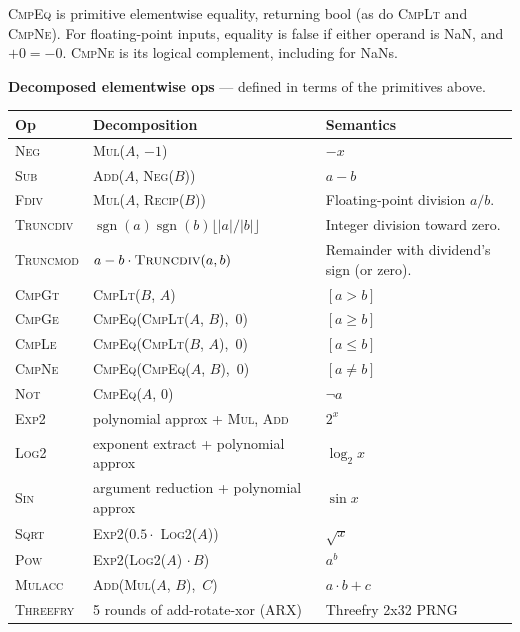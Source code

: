 \documentclass[10pt,letterpaper]{article}
\newcommand{\op}[1]{\textsc{#1}}
\begin{document}
\medskip
\op{CmpEq} is primitive elementwise equality, returning bool (as do \op{CmpLt} and \op{CmpNe}). For floating-point inputs, equality is false if either operand is NaN, and $+0 = -0$. \op{CmpNe} is its logical complement, including for NaNs.

\medskip
\noindent\begin{minipage}{\linewidth}
\textbf{Decomposed elementwise ops} --- defined in terms of the primitives above.

\smallskip
\begin{tabular}{@{}l l l@{}}
\toprule
\textbf{Op} & \textbf{Decomposition} & \textbf{Semantics} \\
\midrule
\op{Neg} & \op{Mul}($A$, $-1$) & $-x$ \\
\op{Sub} & \op{Add}($A$, \op{Neg}($B$)) & $a - b$ \\
\op{Fdiv} & \op{Mul}($A$, \op{Recip}($B$)) & Floating-point division $a / b$. \\
\op{Truncdiv} & $\operatorname{sgn}(a)\operatorname{sgn}(b)\lfloor |a|/|b| \rfloor$ & Integer division toward zero. \\
\op{Truncmod} & $a - b \cdot \op{Truncdiv}(a,b)$ & Remainder with dividend's sign (or zero). \\
\op{CmpGt} & \op{CmpLt}($B$, $A$) & $[a > b]$ \\
\op{CmpGe} & \op{CmpEq}(\op{CmpLt}($A$, $B$),\, $0$) & $[a \ge b]$ \\
\op{CmpLe} & \op{CmpEq}(\op{CmpLt}($B$, $A$),\, $0$) & $[a \le b]$ \\
\op{CmpNe} & \op{CmpEq}(\op{CmpEq}($A$, $B$),\, $0$) & $[a \ne b]$ \\
\op{Not} & \op{CmpEq}($A$, $0$) & $\lnot a$ \\[4pt]
\op{Exp2} & polynomial approx + \op{Mul}, \op{Add} & $2^x$ \\
\op{Log2} & exponent extract + polynomial approx & $\log_2 x$ \\
\op{Sin} & argument reduction + polynomial approx & $\sin x$ \\
\op{Sqrt} & \op{Exp2}($0.5 \cdot$ \op{Log2}($A$)) & $\sqrt{x}$ \\
\op{Pow} & \op{Exp2}(\op{Log2}($A$) $\cdot\, B$) & $a^b$ \\
\op{Mulacc} & \op{Add}(\op{Mul}($A$, $B$),\, $C$) & $a \cdot b + c$ \\
\op{Threefry} & 5 rounds of add-rotate-xor (ARX) & Threefry 2x32 PRNG \\
\bottomrule
\end{tabular}
\end{minipage}
\end{document}
